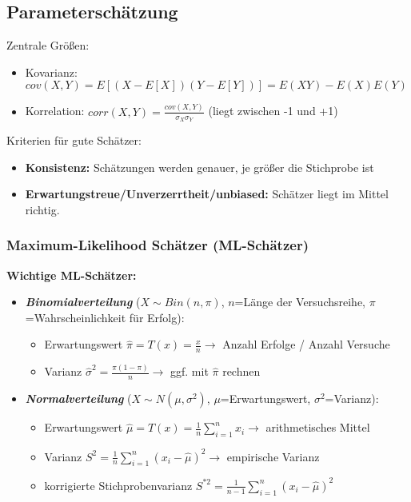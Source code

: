 \subsection{Parameterschätzung}

Zentrale Größen:
\begin{itemize}
    \item Kovarianz: \(cov(X,Y)=E[(X-E[X])(Y-E[Y])]=E(XY)-E(X)E(Y)\)
    \item Korrelation: \(corr(X,Y)=\frac{cov(X,Y)}{\sigma_X\sigma_Y}\) (liegt zwischen -1 und +1)
\end{itemize}

Kriterien für gute Schätzer:
\begin{itemize}
    \item \textbf{Konsistenz:} Schätzungen werden genauer, je größer die Stichprobe ist
    \item \textbf{Erwartungstreue/Unverzerrtheit/unbiased:} Schätzer liegt im Mittel richtig.
\end{itemize}

\subsubsection{Maximum-Likelihood Schätzer (ML-Schätzer)}

\textbf{Wichtige ML-Schätzer:}

\begin{itemize}
    \item \textbf{\emph{Binomialverteilung}} (\(X\sim Bin(n, \pi)\), \(n\)=Länge der Versuchsreihe, \(\pi\)=Wahrscheinlichkeit für Erfolg):
    \begin{itemize}
        \item Erwartungswert \(\hat{\pi}=T(x)=\frac{x}{n} \rightarrow \) Anzahl Erfolge / Anzahl Versuche
        \item Varianz \(\hat{\sigma}^2=\frac{\pi(1-\pi)}{n} \rightarrow \) ggf. mit \(\hat{\pi}\) rechnen
    \end{itemize}
    \item \textbf{\emph{Normalverteilung}} (\(X\sim N(\mu, \sigma^2)\), \(\mu\)=Erwartungswert, \(\sigma^2\)=Varianz):
    \begin{itemize}
        \item Erwartungswert \(\hat{\mu}=T(x)=\frac{1}{n}\sum_{i=1}^{n}x_i \rightarrow \) arithmetisches Mittel
        \item Varianz \(S^2=\frac{1}{n}\sum_{i=1}^{n}(x_i-\hat{\mu})^2 \rightarrow \) empirische Varianz
        \item korrigierte Stichprobenvarianz \(S^{*2}=\frac{1}{n-1}\sum_{i=1}^{n}(x_i-\hat{\mu})^2 \)
    \end{itemize}
\end{itemize}

